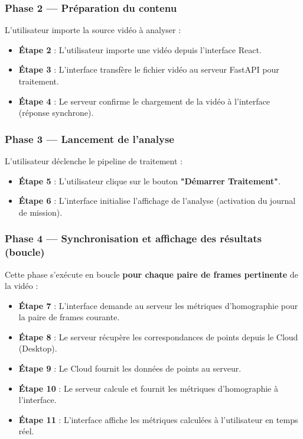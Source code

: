\subsubsection*{Phase 2 — Préparation du contenu}
L'utilisateur importe la source vidéo à analyser :
\begin{itemize}[leftmargin=1.5em]
  \item \textbf{Étape 2} : L'utilisateur importe une vidéo depuis l'interface React.
  \item \textbf{Étape 3} : L'interface transfère le fichier vidéo au serveur FastAPI pour
        traitement.
  \item \textbf{Étape 4} : Le serveur confirme le chargement de la vidéo à l'interface
        (réponse synchrone).
\end{itemize}
 
\subsubsection*{Phase 3 — Lancement de l'analyse}
L'utilisateur déclenche le pipeline de traitement :
\begin{itemize}[leftmargin=1.5em]
  \item \textbf{Étape 5} : L'utilisateur clique sur le bouton \textbf{"Démarrer Traitement"}.
  \item \textbf{Étape 6} : L'interface initialise l'affichage de l'analyse (activation du
        journal de mission).
\end{itemize}
 
\subsubsection*{Phase 4 — Synchronisation et affichage des résultats (boucle)}
Cette phase s'exécute en boucle \textbf{pour chaque paire de frames pertinente} de la vidéo :
\begin{itemize}[leftmargin=1.5em]
  \item \textbf{Étape 7} : L'interface demande au serveur les métriques d'homographie pour la
        paire de frames courante.
  \item \textbf{Étape 8} : Le serveur récupère les correspondances de points depuis le Cloud
        (Desktop).
  \item \textbf{Étape 9} : Le Cloud fournit les données de points au serveur.
  \item \textbf{Étape 10} : Le serveur calcule et fournit les métriques d'homographie à
        l'interface.
  \item \textbf{Étape 11} : L'interface affiche les métriques calculées à l'utilisateur en
        temps réel.
\end{itemize}
 
